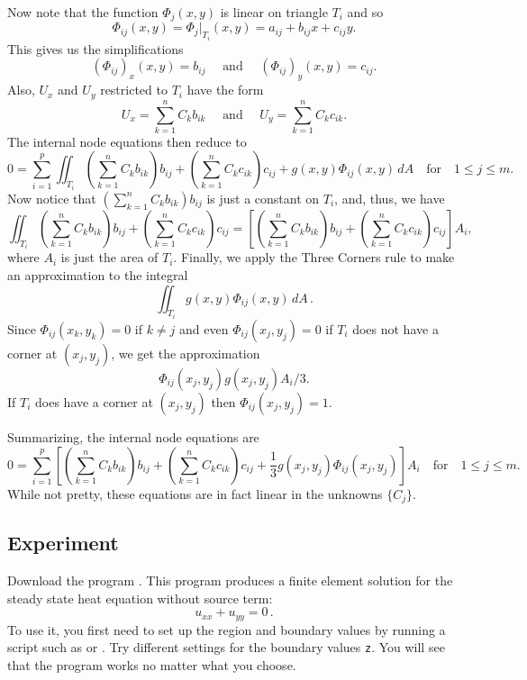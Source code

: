 Now note that the function $\Phi_j(x,y)$ is linear on triangle $T_i$ and
so
$$
     \Phi_{ij}(x,y) = \Phi_j|_{T_i}(x,y) = a_{ij} + b_{ij} x + c_{ij} y.
$$
This gives us the simplifications
$$
     (\Phi_{ij})_x(x,y) = b_{ij} \quad \textrm{ and } \quad
  (\Phi_{ij})_y(x,y) = c_{ij}.
$$
Also, $U_x$ and $U_y$ restricted to $T_i$ have the form
$$
    U_x = \sum_{k=1}^n C_k b_{ik} \quad \textrm{ and } \quad
     U_y = \sum_{k=1}^n C_k c_{ik}.
$$
The internal node equations then reduce to
$$
 0 =  \sum_{i=1}^p \iint_{T_i}
                   \left( \sum_{k=1}^n C_k  b_{ik} \right) b_{ij}
                 + \left( \sum_{k=1}^n C_k c_{ik} \right)  c_{ij}
                                     +  g(x,y) \Phi_{ij}(x,y) \,dA
\quad\text{for}\quad 1 \le j \le m.
$$
Now notice that $ \left( \sum_{k=1}^n C_k  b_{ik} \right) b_{ij}$
is just a constant on $T_i$, and, thus, we have
$$
\iint_{T_i} \left( \sum_{k=1}^n C_k  b_{ik} \right) b_{ij}
           + \left( \sum_{k=1}^n C_k c_{ik} \right)  c_{ij}
=  \left[ \left( \sum_{k=1}^n C_k  b_{ik} \right) b_{ij}
           + \left( \sum_{k=1}^n C_k c_{ik} \right)  c_{ij} \right] A_i,
$$
where $A_i$ is just the area of $T_i$.
Finally, we apply the Three Corners rule to make an approximation to the integral
$$
   \iint_{T_i} g(x,y) \Phi_{ij}(x,y) \,dA\,.
$$
Since $\Phi_{ij}(x_k,y_k)=0$ if $k\not=j$ and
even $\Phi_{ij}(x_j,y_j)=0$ if $T_i$ does not have a corner at
$(x_j,y_j)$, we get the approximation
$$
	 \Phi_{ij}(x_j,y_j)g(x_j,y_j){A_i}/{3}.
$$
If $T_i$ does have a corner at $(x_j,y_j)$ then $\Phi_{ij}(x_j,y_j)=1$.

Summarizing, the internal node equations are
$$
 0 = \sum_{i=1}^p \left[ \left( \sum_{k=1}^n C_k  b_{ik} \right) b_{ij}
           + \left( \sum_{k=1}^n C_k c_{ik} \right)  c_{ij}
           + \frac{1}{3} g(x_j,y_j)\Phi_{ij}(x_j,y_j) \right] A_i
\quad\text{for}\quad 1 \le j \le m.
$$
While not pretty, these equations are in fact linear in the unknowns $\{C_j\}$.



\subsection*{Experiment}

Download the program .
This program produces a finite element solution for the steady
state heat equation without source term:
$$
   u_{xx} + u_{yy} = 0
\,.
$$
To use it, you first need to set up the region and boundary values by
running a script such as  or .
Try different settings for the boundary values \verb&z&. You will see that the
program works no matter what you choose.


